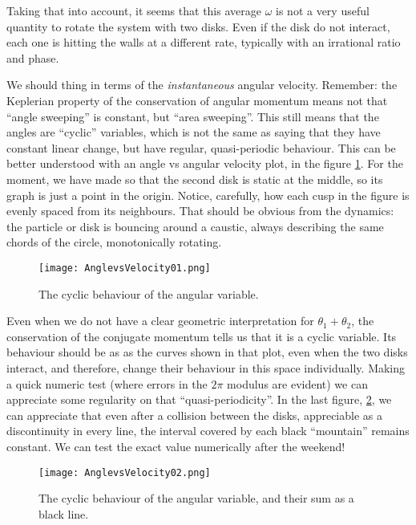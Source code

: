 \documentclass[letterpaperr,12pt]{article}
\begin{document}
Taking that into account, it seems that this
average $\omega$ is not a very useful quantity to rotate the system
with two disks. Even if the disk do not interact, each one is hitting
the walls at a different rate, typically with an irrational ratio
and phase. 

We should thing in terms of the \emph{instantaneous} angular
velocity. Remember: the Keplerian property of the conservation
of angular momentum means not that ``angle sweeping'' is constant,
but ``area sweeping''. This still means that the angles are
``cyclic'' variables, which is not the same as saying that
they have constant linear change, but have regular, quasi-periodic
behaviour. This can be better understood with an angle vs angular
velocity plot, in the figure \ref{anglevsvelo}. For the
moment, we have made so that the second disk is static at the middle,
so its graph is just a point in the origin.
Notice, carefully, how each cusp in the figure
is evenly spaced from its neighbours. That should be obvious
from the dynamics: the particle or disk is bouncing around a 
caustic, always describing the same chords of the circle,
monotonically rotating. 

\begin{figure}[h]
\centering
\texttt{[image: AnglevsVelocity01.png]}
\caption{The cyclic behaviour of the angular variable.}
\label{anglevsvelo}
\end{figure}

Even when we do not have a clear geometric interpretation
for $\theta_1+\theta_2$, the conservation of the conjugate
momentum tells us that it is a cyclic variable.
Its behaviour should be as as the curves shown in
that plot, even when the two disks interact, and therefore,
change their behaviour in this space individually.
Making a quick numeric test (where errors in the
$2 \pi$ modulus are evident) we can appreciate some regularity
on that ``quasi-periodicity''. In the last figure, \ref{anglevsvelotest},
we can appreciate that even after a collision between the disks,
appreciable as a discontinuity in every line, the
interval covered by each black ``mountain'' remains constant.
We can test the exact value numerically after the weekend!


\begin{figure}[h]
\centering
\texttt{[image: AnglevsVelocity02.png]}
\caption{The cyclic behaviour of the angular variable, and their sum
as a black line.}
\label{anglevsvelotest}
\end{figure}


\end{document}
